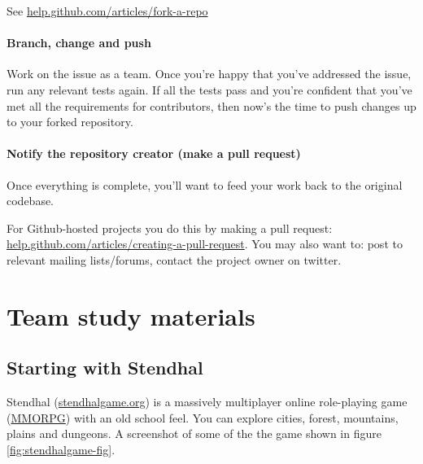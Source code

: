 \documentclass[
]{book}
\begin{document}
See \href{https://help.github.com/articles/fork-a-repo/}{help.github.com/articles/fork-a-repo}

\hypertarget{bcp}{%
\subsection{Branch, change and push}\label{bcp}}

Work on the issue as a team. Once you're happy that you've addressed the issue, run any relevant tests again. If all the tests pass and you're confident that you've met all the requirements for contributors, then now's the time to push changes up to your forked repository.

\hypertarget{pullrequest}{%
\subsection{Notify the repository creator (make a pull request)}\label{pullrequest}}

Once everything is complete, you'll want to feed your work back to the original codebase.

For Github-hosted projects you do this by making a pull request: \href{https://help.github.com/articles/creating-a-pull-request}{help.github.com/articles/creating-a-pull-request}. You may also want to: post to relevant mailing lists/forums, contact the project owner on twitter.

\hypertarget{part-team-study-materials}{%
\part{Team study materials}\label{part-team-study-materials}}

\hypertarget{starting}{%
\chapter{Starting with Stendhal}\label{starting}}

Stendhal (\href{https://stendhalgame.org/}{stendhalgame.org}) is a massively multiplayer online role-playing game (\href{https://en.wikipedia.org/wiki/Massively_multiplayer_online_role-playing_game}{MMORPG}) with an old school feel. You can explore cities, forest, mountains, plains and dungeons. A screenshot of some of the the game shown in figure \ref{fig:stendhalgame-fig}.
\end{document}
